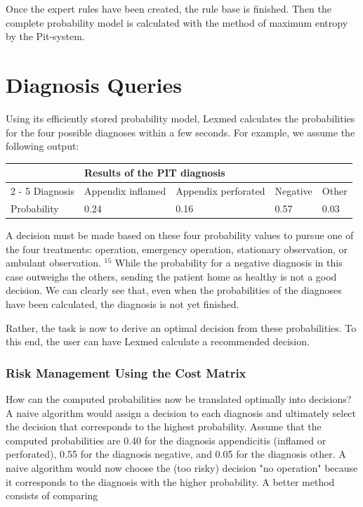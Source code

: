 \documentclass[10pt]{book}
\begin{document}
Once the expert rules have been created, the rule base is finished. Then the complete probability model is calculated with the method of maximum entropy by the Pit-system.

\section*{Diagnosis Queries}
Using its efficiently stored probability model, Lexmed calculates the probabilities for the four possible diagnoses within a few seconds. For example, we assume the following output:

\begin{center}
\begin{tabular}{lllll}
\hline
 & \multicolumn{4}{l}{Results of the PIT diagnosis} \\
\cline { 2 - 5 }
Diagnosis & Appendix inflamed & Appendix perforated & Negative & Other \\
\hline
Probability & 0.24 & 0.16 & 0.57 & 0.03 \\
\hline
\end{tabular}
\end{center}

A decision must be made based on these four probability values to pursue one of the four treatments: operation, emergency operation, stationary observation, or ambulant observation. ${ }^{15}$ While the probability for a negative diagnosis in this case outweighs the others, sending the patient home as healthy is not a good decision. We can clearly see that, even when the probabilities of the diagnoses have been calculated, the diagnosis is not yet finished.

Rather, the task is now to derive an optimal decision from these probabilities. To this end, the user can have Lexmed calculate a recommended decision.

\subsubsection*{Risk Management Using the Cost Matrix}
How can the computed probabilities now be translated optimally into decisions? A naive algorithm would assign a decision to each diagnosis and ultimately select the decision that corresponds to the highest probability. Assume that the computed probabilities are 0.40 for the diagnosis appendicitis (inflamed or perforated), 0.55 for the diagnosis negative, and 0.05 for the diagnosis other. A naive algorithm would now choose the (too risky) decision "no operation" because it corresponds to the diagnosis with the higher probability. A better method consists of comparing
\end{document}
